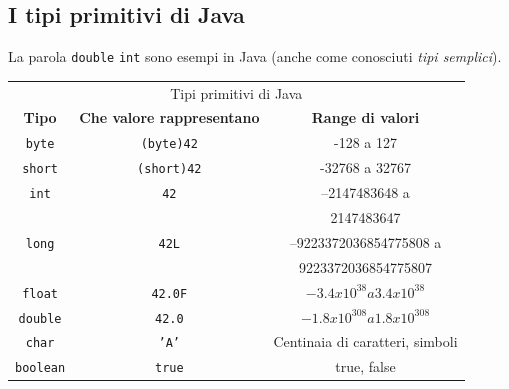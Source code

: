 \subsection*{I tipi primitivi di Java}
\begin{frame}
\begin{block}{}
La parola \texttt{double} \texttt{int} sono esempi in Java (anche come conosciuti \textit{tipi semplici}).
\end{block}
\begin{table}[h]\footnotesize
\begin{tabular}{c c c}
\toprule
\multicolumn{3}{c}{Tipi primitivi di Java}\\
\cmidrule(r){1-3}
\textbf{Tipo} & \textbf{Che valore rappresentano} & \textbf{Range di valori}\\
\hline
\texttt{byte} & \texttt{(byte)42} & -128 a 127 \\
\hline
\texttt{short} & \texttt{(short)42} & -32768 a 32767 \\
\hline
\texttt{int} & \texttt{42} & –2147483648 a \\ 
 & & 2147483647\\
\hline
\texttt{long} & \texttt{42L} & –9223372036854775808 a\\
& & 9223372036854775807\\
\hline
\texttt{float} & \texttt{42.0F} & $-3.4x10^{38} a 3.4x10^{38}$\\
\hline
\texttt{double} & \texttt{42.0} & $-1.8x10^{308} a 1.8x10^{308}$\\
\hline
\texttt{char} & \texttt{'A'} & Centinaia di caratteri, simboli \\
\hline
\texttt{boolean} & \texttt{true} & true, false\\
\bottomrule
\end{tabular}
\end{table}
\end{frame}

